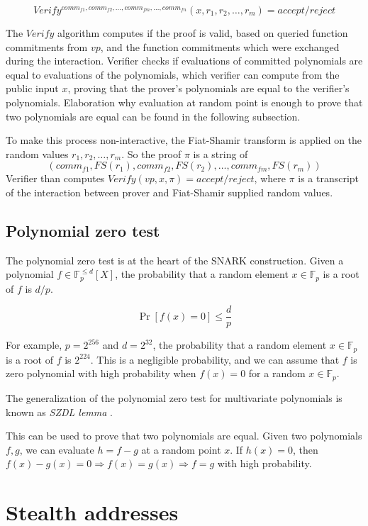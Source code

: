 \[ Verify^{comm_{f1}, comm_{f2}, \dots, comm_{fm}, \ldots, comm_{fn}}(x, r_1, r_2, \dots, r_m) = accept/reject \]

The $Verify$ algorithm computes if the proof is valid, based on queried
function commitments from $vp$, and the function commitments which were
exchanged during the interaction. Verifier checks if evaluations
of committed polynomials are equal to evaluations of the polynomials, which
verifier can compute from the public input $x$, proving that the prover's
polynomials are equal to the verifier's polynomials. Elaboration why evaluation
at random point is enough to prove that two polynomials are equal can be found
in the following subsection.

To make this process non-interactive, the Fiat-Shamir transform is applied on
the random values $r_1, r_2, \dots, r_m$. So the proof $\pi$ is a string of
\[ (comm_{f1}, FS(r_1), comm_{f2}, FS(r_2), \dots, comm_{fm}, FS(r_m)) \]
Verifier than computes $Verify(vp, x, \pi) = accept/reject$, where $\pi$ is
a transcript of the interaction between prover and Fiat-Shamir supplied random
values.

\subsection{Polynomial zero test}

The polynomial zero test is at the heart of the SNARK construction. Given a
polynomial $f \in \mathbb{F}_p^{\leq d}[X]$, the probability that a random
element $x \in \mathbb{F}_p$ is a root of $f$ is $d/p$.

\[ \Pr[f(x) = 0] \leq \frac{d}{p} \]

For example, $p = 2^{256}$ and $d = 2^{32}$, the probability that a random
element $x \in \mathbb{F}_p$ is a root of $f$ is $2^{224}$. This is a negligible
probability, and we can assume that $f$ is zero polynomial with high
probability when $f(x) = 0$ for a random $x \in \mathbb{F}_p$.

The generalization of the polynomial zero test for multivariate polynomials is
known as \textit{SZDL lemma} \cite{Schwartz1980,Zippel1979,Demillo1978}.

This can be used to prove that two polynomials are equal. Given two polynomials
$f, g$, we can evaluate $h = f - g$ at a random point $x$. If $h(x) = 0$, then
$f(x) - g(x) = 0 \Longrightarrow f(x) = g(x) \Longrightarrow f = g$ with high probability.

\section{Stealth addresses}

